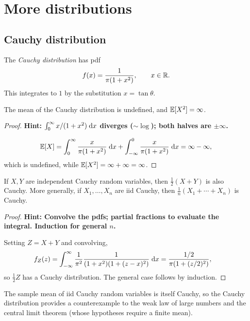 \documentclass[a4paper]{article}
\begin{document}
\section{More distributions}
\subsection{Cauchy distribution}

\begin{defi}
  The \emph{Cauchy distribution} has pdf
  \[
    f(x) = \frac{1}{\pi(1 + x^2)}, \qquad x \in \mathbb{R}.
  \]
  This integrates to $1$ by the substitution $x = \tan\theta$.
\end{defi}

\begin{prop}
  The mean of the Cauchy distribution is undefined, and $\mathbb{E}[X^2] = \infty$.
\end{prop}

\begin{proof}
  \textbf{Hint: $\int_0^\infty x/(1+x^2)\;\mathrm{d} x$ diverges ($\sim \log$); both halves are $\pm\infty$.}

  \[
    \mathbb{E}[X] = \int_0^\infty \frac{x}{\pi(1 + x^2)}\;\mathrm{d} x + \int_{-\infty}^0 \frac{x}{\pi(1 + x^2)}\;\mathrm{d} x = \infty - \infty,
  \]
  which is undefined, while $\mathbb{E}[X^2] = \infty + \infty = \infty$.
\end{proof}

\begin{prop}
  If $X, Y$ are independent Cauchy random variables, then $\frac{1}{2}(X + Y)$ is also Cauchy. More generally, if $X_1, \dotsc, X_n$ are iid Cauchy, then $\frac{1}{n}(X_1 + \dotsb + X_n)$ is Cauchy.
\end{prop}

\begin{proof}
  \textbf{Hint: Convolve the pdfs; partial fractions to evaluate the integral. Induction for general $n$.}

  Setting $Z = X + Y$ and convolving,
  \begin{align*}
    f_Z(z) &= \int_{-\infty}^\infty \frac{1}{\pi^2} \frac{1}{(1 + x^2)(1 + (z - x)^2)}\;\mathrm{d} x = \frac{1/2}{\pi(1 + (z/2)^2)},
  \end{align*}
  so $\frac{1}{2}Z$ has a Cauchy distribution. The general case follows by induction.
\end{proof}

\begin{remark}
  The sample mean of iid Cauchy random variables is itself Cauchy, so the Cauchy distribution provides a counterexample to the weak law of large numbers and the central limit theorem (whose hypotheses require a finite mean).
\end{remark}
\end{document}
